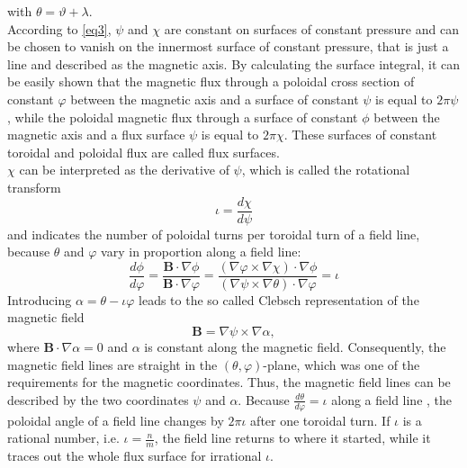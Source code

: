 with $ \theta = \vartheta + \lambda$.\\
According to \ref{eq3}, $\psi$ and $\chi$ are constant on surfaces of constant pressure and can be chosen to vanish on the innermost surface of constant pressure, that is just a line and described as the magnetic axis. By calculating the surface integral, it can be easily shown that the magnetic flux through a poloidal cross section of constant $\varphi$ between the magnetic axis and a surface of constant $\psi$ is equal to $2\pi\psi$, while the poloidal magnetic flux through a surface of constant $\phi$ between the magnetic axis and a flux surface $\psi$ is equal to $2\pi\chi$. These surfaces of constant toroidal and poloidal flux are called flux surfaces. \\
$\chi$ can be interpreted as the derivative of $\psi$, which is called the rotational transform
\begin{equation}
    \iota = \frac{d\chi}{d\psi}
\end{equation}
and indicates the number of poloidal turns per toroidal turn of a field line, because $\theta$ and $\varphi$ vary in proportion along a field line:
\begin{equation}
    \frac{d\phi}{d\varphi} = \frac{\textbf{B}\cdot \nabla \phi}{\textbf{B}\cdot \nabla \varphi} = \frac{(\nabla \varphi \times \nabla \chi) \cdot \nabla \phi}{(\nabla \psi \times \nabla \theta) \cdot \nabla \varphi} = \iota
\end{equation}
Introducing $\alpha = \theta - \iota \varphi$ leads to the so called Clebsch representation of the magnetic field
\begin{equation}
    \textbf{B} = \nabla \psi \times \nabla \alpha,
\end{equation}
where $\textbf{B} \cdot \nabla \alpha = 0$ and $\alpha$ is constant along the magnetic field. Consequently, the magnetic field lines are straight in the $(\theta, \varphi)$-plane, which was one of the requirements for the magnetic coordinates. Thus, the magnetic field lines can be described by the two coordinates $\psi$ and $\alpha$. Because $\frac{d\theta}{d\varphi} = \iota$ along a field line , the poloidal angle of a field line changes by $2\pi \iota$ after one toroidal turn. If $\iota$ is a rational number, i.e. $\iota = \frac{n}{m}$, the field line returns to where it started, while it traces out the whole flux surface for irrational $\iota$. \\


